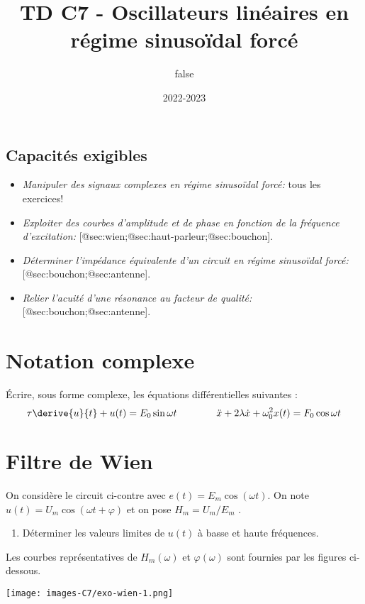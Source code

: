 \documentclass[
  10pt,
  a4paper,
  DIV=18]{scrartcl}
\title{TD C7 - Oscillateurs linéaires en régime sinusoïdal forcé}
\author{false}
\date{2022-2023}
\providecommand{\tightlist}{%
  \setlength{\itemsep}{0pt}\setlength{\parskip}{0pt}}
\begin{document}
\maketitle

\hypertarget{capacituxe9s-exigibles}{%
\subsection*{Capacités exigibles}\label{capacituxe9s-exigibles}}

\begin{itemize}
\item
  \emph{Manipuler des signaux complexes en régime sinusoïdal forcé:}
  tous les exercices!
\item
  \emph{Exploiter des courbes d'amplitude et de phase en fonction de la
  fréquence d'excitation:}
  {[}@sec:wien;@sec:haut-parleur;@sec:bouchon{]}.
\item
  \emph{Déterminer l'impédance équivalente d'un circuit en régime
  sinusoïdal forcé:} {[}@sec:bouchon;@sec:antenne{]}.
\item
  \emph{Relier l'acuité d'une résonance au facteur de qualité:}
  {[}@sec:bouchon;@sec:antenne{]}.
\end{itemize}

\hypertarget{sec:notation}{%
\section{Notation complexe}\label{sec:notation}}

Écrire, sous forme complexe, les équations différentielles suivantes :
\[\tau \derive{u}{t} + u(t) = E_0\sin\omega t \qquad \qquad \ddot{x} +  2\lambda \dot x + \omega_0^2 x(t) =F_0\cos\omega t\]

\hypertarget{sec:wien}{%
\section{Filtre de Wien}\label{sec:wien}}

\begin{multicols}{2}

On considère le circuit ci-contre avec \(e(t) = E_m \cos(\omega t)\). On
note \(u(t) = U_m \cos(\omega t + \varphi)\) et on pose
\(H_m = U_m / E_m\) .

\begin{enumerate}
\def\labelenumi{\arabic{enumi}.}
\tightlist
\item
  Déterminer les valeurs limites de \(u(t)\) à basse et haute
  fréquences.
\end{enumerate}

Les courbes représentatives de \(H_m (\omega)\) et \(\varphi(\omega)\)
sont fournies par les figures ci-dessous.

\begin{center}

\texttt{[image: images-C7/exo-wien-1.png]}

\end{center}

\end{multicols}
\end{document}
